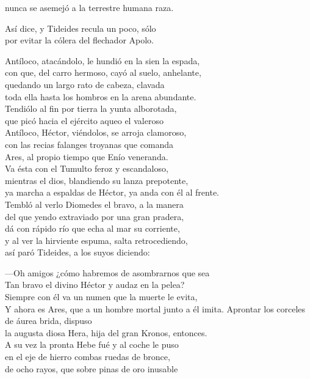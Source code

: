 nunca se asemejó a la terrestre humana raza.\par
Así dice, y Tideides recula un poco, sólo\\
por evitar la cólera del flechador Apolo.\par
\poend
%
\separator
%
\postart
{}
Antíloco, atacándolo, le hundió en la sien la espada,\\
con que, del carro hermoso, cayó al suelo, anhelante,\\
quedando un largo rato de cabeza, clavada\\
toda ella hasta los hombros en la arena abundante.\\
Tendiólo al fin por tierra la yunta alborotada,\\
que picó hacia el ejército aqueo el valeroso\\
Antíloco, Héctor, viéndolos, se arroja clamoroso,\\
con las recias falanges troyanas que comanda\\
Ares, al propio tiempo que Enío veneranda.\\
Va ésta con el Tumulto feroz y escandaloso,\\
mientras el dios, blandiendo su lanza prepotente,\\
ya marcha a espaldas de Héctor, ya anda con él al frente.\\
Tembló al verlo Diomedes el bravo, a la manera\\
del que yendo extraviado por una gran pradera,\\
dá con rápido río que echa al mar su corriente,\\
y al ver la hirviente espuma, salta retrocediendo,\\
así paró Tideides, a los suyos diciendo:\par
---Oh amigos ¿cómo habremos de asombrarnos que sea\\
Tan bravo el divino Héctor y audaz en la pelea?\\
Siempre con él va un numen que la muerte le evita,\\
Y ahora es Ares, que a un hombre mortal junto a él imita.
\poend
\separator
%
\postart
{}
Aprontar los corceles de áurea brida, dispuso\\
la augusta diosa Hera, hija del gran Kronos, entonces.\\
A su vez la pronta Hebe fué y al coche le puso\\
en el eje de hierro combas ruedas de bronce,\\
de ocho rayos, que sobre pinas de oro inusable\\
